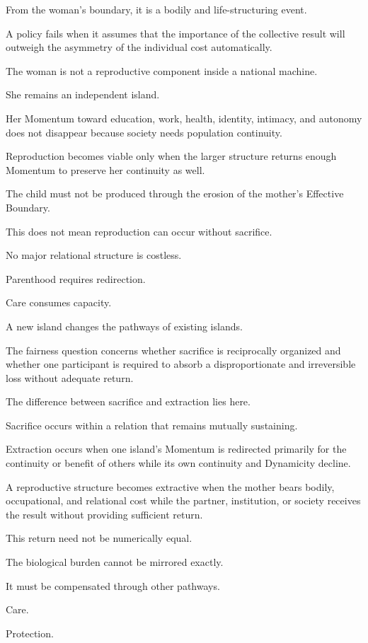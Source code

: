 From the woman’s boundary, it is a bodily and life-structuring event.

A policy fails when it assumes that the importance of the collective result will outweigh the asymmetry of the individual cost automatically.

The woman is not a reproductive component inside a national machine.

She remains an independent island.

Her Momentum toward education, work, health, identity, intimacy, and autonomy does not disappear because society needs population continuity.

Reproduction becomes viable only when the larger structure returns enough Momentum to preserve her continuity as well.

The child must not be produced through the erosion of the mother’s Effective Boundary.

This does not mean reproduction can occur without sacrifice.

No major relational structure is costless.

Parenthood requires redirection.

Care consumes capacity.

A new island changes the pathways of existing islands.

The fairness question concerns whether sacrifice is reciprocally organized and whether one participant is required to absorb a disproportionate and irreversible loss without adequate return.

The difference between sacrifice and extraction lies here.

Sacrifice occurs within a relation that remains mutually sustaining.

Extraction occurs when one island’s Momentum is redirected primarily for the continuity or benefit of others while its own continuity and Dynamicity decline.

A reproductive structure becomes extractive when the mother bears bodily, occupational, and relational cost while the partner, institution, or society receives the result without providing sufficient return.

This return need not be numerically equal.

The biological burden cannot be mirrored exactly.

It must be compensated through other pathways.

Care.

Protection.

